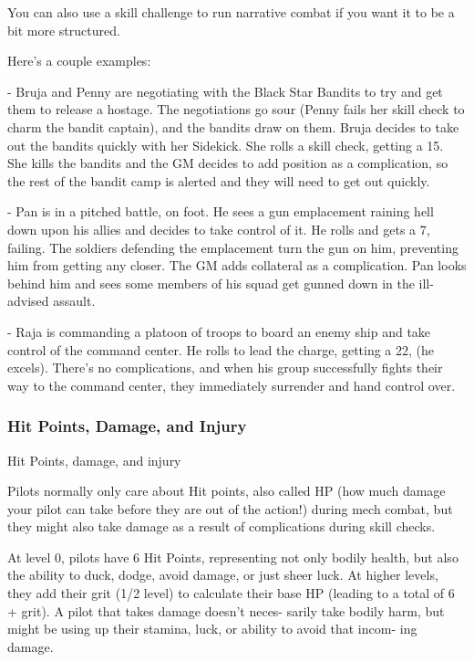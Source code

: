 You can also use a skill challenge to run narrative combat if you want it to be a bit more
structured.


Here’s a couple examples:

	        - Bruja and Penny are negotiating with the Black Star Bandits to try and get them to
release a hostage. The negotiations go sour (Penny fails her skill check to charm the bandit
captain), and the bandits draw on them. Bruja decides to take out the bandits quickly with her
Sidekick. She rolls a skill check, getting a 15. She kills the bandits and the GM decides to add
position as a complication, so the rest of the bandit camp is alerted and they will need to get out
quickly.

	        - Pan is in a pitched battle, on foot. He sees a gun emplacement raining hell down upon
his allies and decides to take control of it. He rolls and gets a 7, failing. The soldiers defending
the emplacement turn the gun on him, preventing him from getting any closer. The GM adds
collateral as a complication. Pan looks behind him and sees some members of his squad get
gunned down in the ill-advised assault.

	        - Raja is commanding a platoon of troops to board an enemy ship and take control of the
command center. He rolls to lead the charge, getting a 22, (he excels). There’s no complications,
and when his group successfully fights their way to the command center, they immediately
surrender and hand control over.


\subsubsection{Hit Points, Damage, and Injury}

                                 Hit Points, damage, and injury

Pilots normally only care about Hit points, also called HP (how much damage your pilot can take
before they are out of the action!) during mech combat, but they might also take damage as a
result of complications during skill checks.

At level 0, pilots have 6 Hit Points, representing not only bodily health, but also the ability to
duck, dodge, avoid damage, or just sheer luck. At higher levels, they add their grit (1/2 level) to
calculate their base HP (leading to a total of 6 + grit). A pilot that takes damage doesn’t neces-
sarily take bodily harm, but might be using up their stamina, luck, or ability to avoid that incom-
ing damage.

